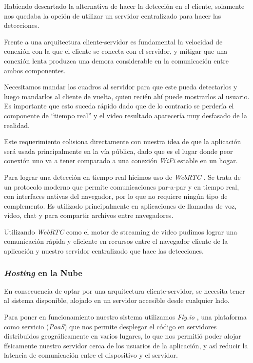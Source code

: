 \documentclass[a4paper]{article}
\begin{document}
Habiendo descartado la alternativa de hacer la detección en el cliente, solamente nos quedaba la opción de utilizar un servidor centralizado para hacer las detecciones.

Frente a una arquitectura cliente-servidor es fundamental la velocidad de conexión con la que el cliente se conecta con el servidor, y mitigar que una conexión lenta produzca una demora considerable en la comunicación entre ambos componentes.

Necesitamos mandar los cuadros al servidor para que este pueda detectarlos y luego mandarlos al cliente de vuelta, quien recién ahí puede mostrarlos al usuario. Es importante que esto suceda rápido dado que de lo contrario se perdería el componente de ``tiempo real'' y el video resultado aparecería muy desfasado de la realidad.

Este requerimiento colisiona directamente con nuestra idea de que la aplicación será usada principalmente en la vía pública, dado que es el lugar donde peor conexión uno va a tener comparado a una conexión \textit{WiFi} estable en un hogar.\medskip

Para lograr una detección en tiempo real hicimos uso de \textit{WebRTC} \cite{webrtc}. Se trata de un protocolo moderno que permite comunicaciones par-a-par y en tiempo real, con interfaces nativas del navegador, por lo que no requiere ningún tipo de complemento. Es utilizado principalmente en aplicaciones de llamadas de voz, video, chat y para compartir archivos entre navegadores.

Utilizando \textit{WebRTC} como el motor de streaming de video pudimos lograr una comunicación rápida y eficiente en recursos entre el navegador cliente de la aplicación y nuestro servidor centralizado que hace las detecciones.

\subsubsection{\textit{Hosting} en la Nube}

En consecuencia de optar por una arquitectura cliente-servidor, se necesita tener al sistema disponible, alojado en un servidor accesible desde cualquier lado.

Para poner en funcionamiento nuestro sistema utilizamos \textit{Fly.io} \cite{flyio}, una plataforma como servicio (\textit{PaaS}) que nos permite desplegar el código en servidores distribuidos geográficamente en varios lugares, lo que nos permitió poder alojar físicamente nuestro servidor cerca de los usuarios de la aplicación, y así reducir la latencia de comunicación entre el dispositivo y el servidor.
\end{document}

